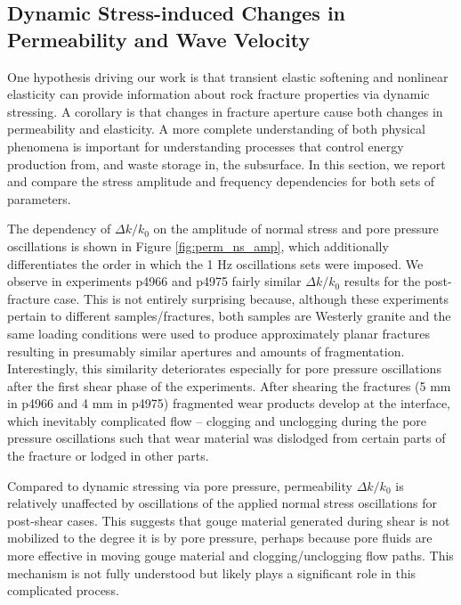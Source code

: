 \documentclass[draft]{agujournal2019}
\begin{document}
\clearpage


\subsection{Dynamic Stress-induced Changes in Permeability and Wave Velocity}

One hypothesis driving our work is that transient elastic softening and nonlinear elasticity can provide information about rock fracture properties via dynamic stressing. A corollary is that changes in fracture aperture cause both changes in permeability and elasticity. A more complete understanding of both physical phenomena is important for understanding processes that control energy production from, and waste storage in, the subsurface. In this section, we report and compare the stress amplitude and frequency dependencies for both sets of parameters. 

The dependency of $ \Delta k/k_0 $ on the amplitude of normal stress and pore pressure oscillations is shown in Figure \ref{fig:perm_ns_amp}, which additionally differentiates the order in which the 1 Hz oscillations sets were imposed. We observe in experiments p4966 and p4975 fairly similar $ \Delta k/k_0 $ results for the post-fracture case. This is not entirely surprising because, although these experiments pertain to different samples/fractures, both samples are Westerly granite and the same loading conditions were used to produce approximately planar fractures resulting in presumably similar apertures and amounts of fragmentation. Interestingly, this similarity deteriorates especially for pore pressure oscillations after the first shear phase of the experiments. After shearing the fractures (5 mm in p4966 and 4 mm in p4975) fragmented wear products develop at the interface, which inevitably complicated flow -- clogging and unclogging during the pore pressure oscillations such that wear material was dislodged from certain parts of the fracture or lodged in other parts.

Compared to dynamic stressing via pore pressure, permeability $ \Delta k/k_0 $ is relatively unaffected by oscillations of the applied normal stress oscillations for post-shear cases. This suggests that gouge material generated during shear is not mobilized to the degree it is by pore pressure, perhaps because pore fluids are more effective in moving gouge material and clogging/unclogging flow paths. This mechanism is not fully understood but likely plays a significant role in this complicated process.
\end{document}
